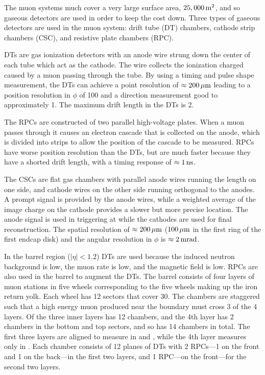 The muon systems much cover a very large surface area, $25,000\text{\,m}^{2}$, and
so gaseous detectors are used in order to keep the cost down. Three types of
gaseous detectors are used in the muon system: drift tube (DT) chambers,
cathode strip chambers (CSC), and resistive plate chambers (RPC).

DTs are gas ionization detectors with an anode wire strung down the center of
each tube which act as the cathode. The wire collects the ionization charged
caused by a muon passing through the tube. By using a timing and pulse shape
measurement, the DTs can achieve a point resolution of $\approx
200\text{\,$\mu$m}$ leading to a position resolution in $\phi$ of 100\micrometers
and a direction measurement good to approximately 1\millirads. The maximum
drift length in the DTs is 2\centimeters.

The RPCs are constructed of two parallel high-voltage plates. When a muon
passes through it causes an electron cascade that is collected on the anode,
which is divided into strips to allow the position of the cascade to be
measured. RPCs have worse position resolution than the DTs, but are much
faster because they have a shorted drift length, with a timing response of
$\approx 1\text{\,ns}$.

The CSCs are flat gas chambers with parallel anode wires running the length on
one side, and cathode wires on the other side running orthogonal to the anodes.
A prompt signal is provided by the anode wires, while a weighted average of the
image charge on the cathode provides a slower but more precise location. The
anode signal is used in triggering at \Lone while the cathodes are used for
final reconstruction. The spatial resolution of $\approx 200\text{\,$\mu$m}$
($100\text{\,$\mu$m}$ in the first ring of the first endcap disk) and the angular
resolution in $\phi$ is $\approx 2\text{\,mrad}$.

In the barrel region ($|\eta| < 1.2$) DTs are used because the induced neutron
background is low, the muon rate is low, and the magnetic field is low. RPCs
are also used in the barrel to augment the DTs. The barrel consists of four
layers of muon stations in five wheels corresponding to the five wheels making
up the iron return yolk. Each wheel has 12 sectors that cover 30\degrees. The
chambers are staggered such that a high energy muon produced near the boundary
must cross 3 of the 4 layers. Of the three inner layers has 12 chambers, and
the 4th layer has 2 chambers in the bottom and top sectors, and so has 14
chambers in total. The first three layers are aligned to measure in \coordrphi
and \coordz, while the 4th layer measures only in \coordrphi. Each chamber
consists of 12 planes of DTs with 2 RPCs---1 on the front and 1 on the
back---in the first two layers, and 1 RPC---on the front---for the second two
layers.

